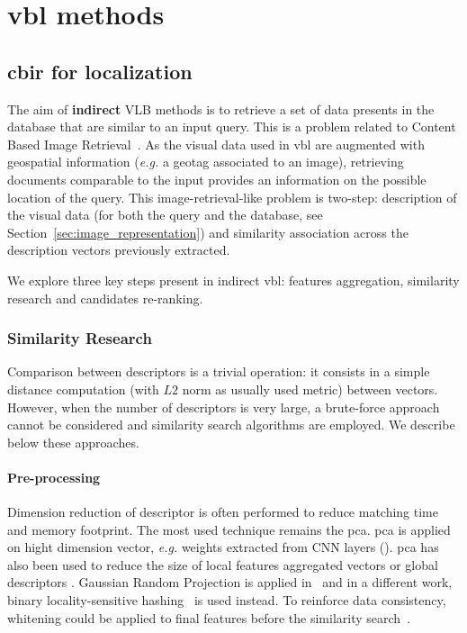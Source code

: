 \section{\acs*{vbl} methods}
\label{sec:vbl_methods}


	
\subsection{\acs*{cbir} for localization}
\label{sec:vbl_as_image_retrieval}
The aim of \textbf{indirect} VLB methods is to retrieve a set of data presents in the database that are similar to an input query. This is a problem related to Content Based Image Retrieval~\citep{Zheng2017}. As the visual data used in \ac{vbl} are augmented with geospatial information (\textit{e.g.} a geotag associated to an image), retrieving documents comparable to the input provides an information on the possible location of the query. This image-retrieval-like problem is two-step: description of the visual data (for both the query and the database, see Section~\ref{sec:image_representation}) and similarity association across the description vectors previously extracted.

We explore three key steps present in indirect \ac{vbl}: features aggregation, similarity research and candidates re-ranking. 


\subsubsection{Similarity Research}
\label{subsubsec:similarity_research}

Comparison between descriptors is a trivial operation: it consists in a simple distance computation (with $L2$ norm as usually used metric) between vectors. However, when the number of descriptors is very large, a brute-force approach cannot be considered and similarity search algorithms are employed. We describe below these approaches.

\paragraph{Pre-processing}
Dimension reduction of descriptor is often performed to reduce matching time and memory footprint. The most used technique remains the \ac{pca}. \ac{pca} is applied on hight dimension vector, \textit{e.g.} weights extracted from CNN layers (\citep{Arandjelovic2017,Gordo2016}). \ac{pca} has also been used to reduce the size of local features aggregated vectors \citep{Kim2015,Torii2015} or global descriptors \citep{Ni2009}. Gaussian Random Projection is applied in~\citep{Sunderhauf2015a,Panphattarasap2016} and in a different work, binary locality-sensitive hashing~\citep{Sunderhauf2015} is used instead. To reinforce data consistency, whitening could be applied to final features before the similarity search~\citep{Jegou2012a,Gong2014,Tolias2016,Arandjelovic2017,Gordo2016,Radenovic2016}.

